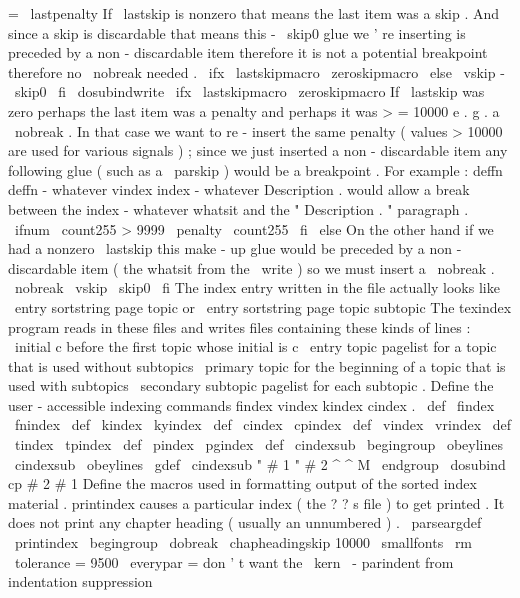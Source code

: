 {{=
\
lastpenalty
%
%
If
\
lastskip
is
nonzero
that
means
the
last
item
was
a
%
skip
.
And
since
a
skip
is
discardable
that
means
this
%
-
\
skip0
glue
we
'
re
inserting
is
preceded
by
a
%
non
-
discardable
item
therefore
it
is
not
a
potential
%
breakpoint
therefore
no
\
nobreak
needed
.
\
ifx
\
lastskipmacro
\
zeroskipmacro
\
else
\
vskip
-
\
skip0
\
fi
%
\
dosubindwrite
%
\
ifx
\
lastskipmacro
\
zeroskipmacro
%
If
\
lastskip
was
zero
perhaps
the
last
item
was
a
penalty
and
%
perhaps
it
was
>
=
10000
e
.
g
.
a
\
nobreak
.
In
that
case
we
want
%
to
re
-
insert
the
same
penalty
(
values
>
10000
are
used
for
various
%
signals
)
;
since
we
just
inserted
a
non
-
discardable
item
any
%
following
glue
(
such
as
a
\
parskip
)
would
be
a
breakpoint
.
For
example
:
%
%
deffn
deffn
-
whatever
%
vindex
index
-
whatever
%
Description
.
%
would
allow
a
break
between
the
index
-
whatever
whatsit
%
and
the
"
Description
.
"
paragraph
.
\
ifnum
\
count255
>
9999
\
penalty
\
count255
\
fi
\
else
%
On
the
other
hand
if
we
had
a
nonzero
\
lastskip
%
this
make
-
up
glue
would
be
preceded
by
a
non
-
discardable
item
%
(
the
whatsit
from
the
\
write
)
so
we
must
insert
a
\
nobreak
.
\
nobreak
\
vskip
\
skip0
\
fi
}
%
The
index
entry
written
in
the
file
actually
looks
like
%
\
entry
{
sortstring
}
{
page
}
{
topic
}
%
or
%
\
entry
{
sortstring
}
{
page
}
{
topic
}
{
subtopic
}
%
The
texindex
program
reads
in
these
files
and
writes
files
%
containing
these
kinds
of
lines
:
%
\
initial
{
c
}
%
before
the
first
topic
whose
initial
is
c
%
\
entry
{
topic
}
{
pagelist
}
%
for
a
topic
that
is
used
without
subtopics
%
\
primary
{
topic
}
%
for
the
beginning
of
a
topic
that
is
used
with
subtopics
%
\
secondary
{
subtopic
}
{
pagelist
}
%
for
each
subtopic
.
%
Define
the
user
-
accessible
indexing
commands
%
findex
vindex
kindex
cindex
.
\
def
\
findex
{
\
fnindex
}
\
def
\
kindex
{
\
kyindex
}
\
def
\
cindex
{
\
cpindex
}
\
def
\
vindex
{
\
vrindex
}
\
def
\
tindex
{
\
tpindex
}
\
def
\
pindex
{
\
pgindex
}
\
def
\
cindexsub
{
\
begingroup
\
obeylines
\
cindexsub
}
{
\
obeylines
%
\
gdef
\
cindexsub
"
#
1
"
#
2
^
^
M
{
\
endgroup
%
\
dosubind
{
cp
}
{
#
2
}
{
#
1
}
}
}
%
Define
the
macros
used
in
formatting
output
of
the
sorted
index
material
.
%
printindex
causes
a
particular
index
(
the
?
?
s
file
)
to
get
printed
.
%
It
does
not
print
any
chapter
heading
(
usually
an
unnumbered
)
.
%
\
parseargdef
\
printindex
{
\
begingroup
\
dobreak
\
chapheadingskip
{
10000
}
%
%
\
smallfonts
\
rm
\
tolerance
=
9500
\
everypar
=
{
}
%
don
'
t
want
the
\
kern
\
-
parindent
from
indentation
suppression
}}
